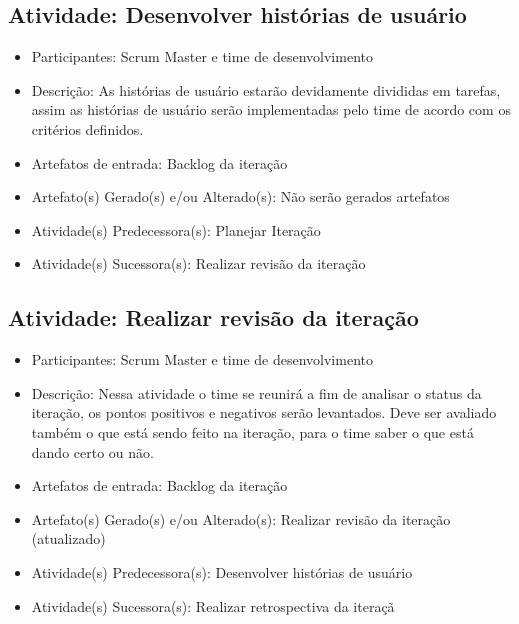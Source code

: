 \subsection{Atividade: Desenvolver histórias de usuário}
\begin{itemize}
\item Participantes: Scrum Master e time de desenvolvimento

\item Descrição: As histórias de usuário estarão devidamente divididas em tarefas, assim as histórias de usuário serão implementadas pelo time de acordo com os critérios definidos.

\item Artefatos de entrada: Backlog da iteração

\item Artefato(s) Gerado(s) e/ou Alterado(s): Não serão gerados artefatos

\item Atividade(s) Predecessora(s): Planejar Iteração
  
\item Atividade(s) Sucessora(s): Realizar revisão da iteração
\end{itemize}

\subsection{Atividade: Realizar revisão da iteração}
\begin{itemize}
\item Participantes: Scrum Master e time de desenvolvimento

\item Descrição: Nessa atividade o time se reunirá a fim de analisar o status da iteração, os pontos positivos e negativos serão levantados. Deve ser avaliado também o que está sendo feito na iteração, para o time saber o que está dando certo ou não.

\item Artefatos de entrada: Backlog da iteração

\item Artefato(s) Gerado(s) e/ou Alterado(s): Realizar revisão da iteração (atualizado)

\item Atividade(s) Predecessora(s): Desenvolver histórias de usuário
  
\item Atividade(s) Sucessora(s): Realizar retrospectiva da iteraçã
\end{itemize}

